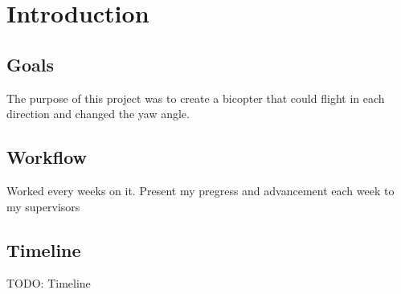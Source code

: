 \chapter{Introduction}
\label{sec:introduction}

\section{Goals}
The purpose of this project was to create a bicopter that could flight in each direction and changed the yaw angle.
\section{Workflow}
Worked every weeks on it.
Present my pregress and advancement each week to my supervisors
\section{Timeline}

TODO: Timeline